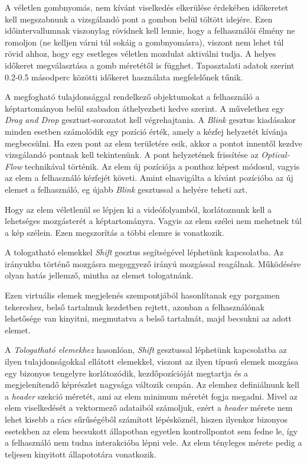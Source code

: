 A véletlen gombnyomás, nem kívánt viselkedés elkerülése érdekében időkeretet kell megszabnunk a vizsgálandó pont a gombon belül töltött idejére. Ezen időintervallumnak viszonylag rövidnek kell lennie, hogy a felhasználói élmény ne romoljon (ne kelljen várni túl sokáig a gombnyomásra), viszont nem lehet túl rövid ahhoz, hogy egy esetleges véletlen mozdulat aktiválni tudja. A helyes időkeret megválasztása a gomb méretétől is függhet. Tapasztalati adatok szerint 0.2-0.5 másodperc közötti időkeret használata megfelelőnek tűnik.


A megfogható tulajdonsággal rendelkező objektumokat a felhasználó a képtartományon belül szabadon áthelyezheti kedve szerint. A művelethez egy \textit{Drag and Drop} gesztust-sorozatot kell végrehajtania. A \textit{Blink} gesztus kiadásakor minden esetben számolódik egy pozíció érték, amely a kézfej helyzetét kívánja megbecsülni. Ha ezen pont az elem területére esik, akkor a pontot innentől kezdve vizsgálandó pontnak kell tekintenünk. A pont helyzetének frissítése az \textit{Optical-Flow} technikával történik. Az elem új pozíciója a ponthoz képest módosul, vagyis az elem a felhasználó kézfejét követi.
Amint elnavigálta a kívánt pozícióba az új elemet a felhasználó, eg újabb \textit{Blink} gesztussal a helyére teheti azt.

Hogy az elem véletlenül se lépjen ki a videófolyamból, korlátoznunk kell a lehetséges mozgásterét a képtartományra. Vagyis az elem szélei nem mehetnek túl a kép szélein. Ezen megszorítás a többi elemre is vonatkozik.


A tologatható elemekkel \textit{Shift} gesztus segítségével léphetünk kapcsolatba. Az irányukba történő mozgásra megeggyező irányú mozgással reagálnak. Működésére olyan hatás jellemző, mintha az elemet tologatnánk.


Ezen virtuális elemek megjelenés szempontjából hasonlítanak egy pargamen tekercshez, belső tartalmuk kezdetben rejtett, azonban a felhasználónak lehetősége van kinyitni, megmutatva a belső tartalmát, majd becsukni az adott elemet.

A \textit{Tologatható elemekhez} hasonlóan, \textit{Shift} gesztussal léphetünk kapcsolatba az ilyen tulajdonságokkal ellátott elemekkel, viszont az ilyen típusú elemek mozgása egy bizonyos tengelyre korlátozódik, kezdőpozícióját megtartja és a megjelenítendő képrészlet nagysága változik csupán. Az elemhez definiálnunk kell a \textit{header} szekció méretét, ami az elem minimum méretét fogja megadni. Mivel az elem viselkedését a vektormező adataiból számoljuk, ezért a \textit{header} mérete nem lehet kisebb a rács sűrűségéből számított lépésköznél, hiszen ilyenkor bizonyos esetekben az elem becsukott állapotban egyetlen kontrollpontot sem fedne le, így a felhasználó nem tudna interakcióba lépni vele.
Az elem tényleges mérete pedig a teljesen kinyitott állapototára vonatkozik.

